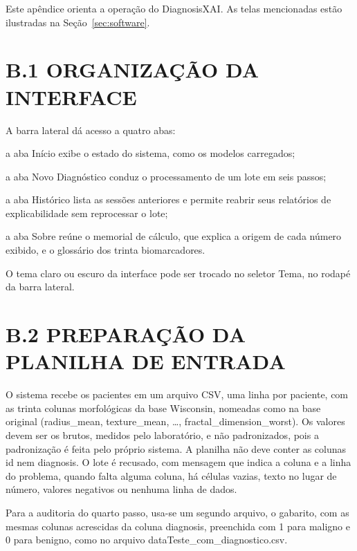 
Este apêndice orienta a operação do DiagnosisXAI. As telas mencionadas estão
ilustradas na Seção~\ref{sec:software}.

\section*{B.1 ORGANIZAÇÃO DA INTERFACE}

A barra lateral dá acesso a quatro abas:

\begin{alineas}
    \item a aba Início exibe o estado do sistema, como os modelos carregados;
    \item a aba Novo Diagnóstico conduz o processamento de um lote em seis
          passos;
    \item a aba Histórico lista as sessões anteriores e permite reabrir seus
          relatórios de explicabilidade sem reprocessar o lote;
    \item a aba Sobre reúne o memorial de cálculo, que explica a origem de cada
          número exibido, e o glossário dos trinta biomarcadores.
\end{alineas}

O tema claro ou escuro da interface pode ser trocado no seletor Tema, no rodapé
da barra lateral.

\section*{B.2 PREPARAÇÃO DA PLANILHA DE ENTRADA}

O sistema recebe os pacientes em um arquivo CSV, uma linha por paciente, com as
trinta colunas morfológicas da base Wisconsin, nomeadas como na base original
(radius\_mean, texture\_mean, \ldots, fractal\_dimension\_worst). Os valores
devem ser os brutos, medidos pelo laboratório, e não padronizados, pois a
padronização é feita pelo próprio sistema. A planilha não deve conter as colunas
id nem diagnosis. O lote é recusado, com mensagem que indica a coluna e a linha
do problema, quando falta alguma coluna, há células vazias, texto no lugar de
número, valores negativos ou nenhuma linha de dados.

Para a auditoria do quarto passo, usa-se um segundo arquivo, o gabarito, com as
mesmas colunas acrescidas da coluna diagnosis, preenchida com 1 para maligno e
0 para benigno, como no arquivo dataTeste\_com\_diagnostico.csv.

